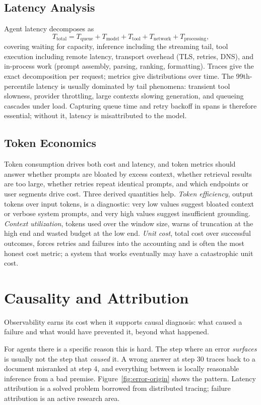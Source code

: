 \documentclass[11pt]{book}
\begin{document}
\subsection{Latency Analysis}

Agent latency decomposes as
\[
T_{\text{total}} = T_{\text{queue}} + T_{\text{model}} + T_{\text{tool}} + T_{\text{network}} + T_{\text{processing}},
\]
covering waiting for capacity, inference including the streaming tail, tool execution including remote latency, transport overhead (TLS, retries, DNS), and in-process work (prompt assembly, parsing, ranking, formatting). Traces give the exact decomposition per request; metrics give distributions over time. The 99th-percentile latency is usually dominated by tail phenomena: transient tool slowness, provider throttling, large contexts slowing generation, and queueing cascades under load. Capturing queue time and retry backoff in spans is therefore essential; without it, latency is misattributed to the model.

\subsection{Token Economics}

Token consumption drives both cost and latency, and token metrics should answer whether prompts are bloated by excess context, whether retrieval results are too large, whether retries repeat identical prompts, and which endpoints or user segments drive cost. Three derived quantities help. \textit{Token efficiency}, output tokens over input tokens, is a diagnostic: very low values suggest bloated context or verbose system prompts, and very high values suggest insufficient grounding. \textit{Context utilization}, tokens used over the window size, warns of truncation at the high end and wasted budget at the low end. \textit{Unit cost}, total cost over successful outcomes, forces retries and failures into the accounting and is often the most honest cost metric; a system that works eventually may have a catastrophic unit cost.

\section{Causality and Attribution}

Observability earns its cost when it supports causal diagnosis: what caused a failure and what would have prevented it, beyond what happened.

For agents there is a specific reason this is hard. The step where an error \textit{surfaces} is usually not the step that \textit{caused} it. A wrong answer at step 30 traces back to a document misranked at step 4, and everything between is locally reasonable inference from a bad premise. Figure~\ref{fig:error-origin} shows the pattern. Latency attribution is a solved problem borrowed from distributed tracing; failure attribution is an active research area.
\end{document}
